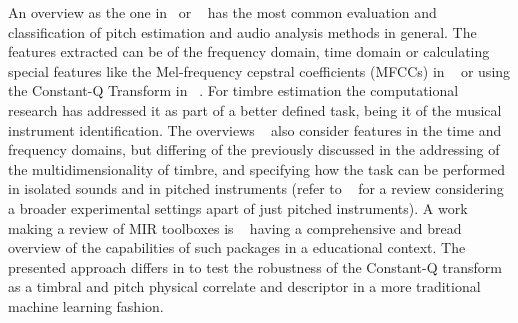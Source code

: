 \documentclass{article}
\begin{document}
An overview as the one in~\cite{gerhard_pitch_2003} or ~\cite{drugman_traditional_2018} has the most common evaluation and classification of pitch estimation and audio analysis methods in general. The features extracted can be of the frequency domain, time domain or calculating special features like the Mel-frequency cepstral coefficients (MFCCs) in ~\cite{rao_pitch_2017} or using the Constant-Q Transform in  ~\cite{argenti_automatic_2011}. For timbre estimation the computational research has addressed it as part of a better defined task, being it of the musical instrument identification. The overviews ~\cite{herrera-boyer_automatic_2006,hall_study_2012} also consider features in the time and frequency domains, but differing of the previously discussed in the addressing of the multidimensionality of timbre, and specifying how the task can be performed in isolated sounds and in pitched instruments (refer to ~\cite{fuhrmann_automatic_nodate} for a review considering a broader experimental settings apart of just pitched instruments). A work making a review of MIR toolboxes is ~\cite{muller_fmp_2019} having a comprehensive and bread overview of the capabilities of such packages in a educational context. The presented approach differs in to test the robustness of the Constant-Q transform as a timbral and pitch physical correlate and descriptor in a more traditional machine learning fashion. 
\end{document}
